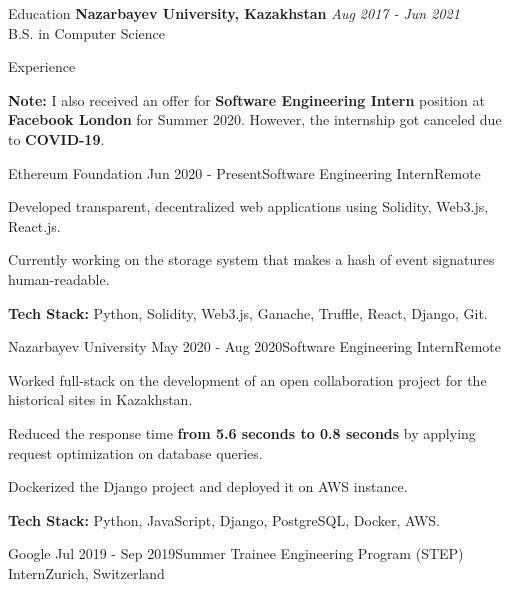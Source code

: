 \documentclass{resume} %
\begin{document}

\begin{rSection}{Education}
{\bf Nazarbayev University, Kazakhstan} \hfill {\em Aug 2017 - Jun 2021} \\ 
B.S. in Computer Science 
\end{rSection}


\begin{rSection}{Experience}

\textbf{Note:} I also received an offer for \textbf{Software Engineering Intern} position at \textbf{Facebook London} for Summer 2020. However, the internship got canceled due to \textbf{COVID-19}.
\smallskip

\begin{rSubsection}{Ethereum Foundation}{ Jun 2020 - Present}{Software Engineering Intern}{Remote}
\item Developed transparent, decentralized web applications using Solidity, Web3.js, React.js.
\item Currently working on the storage system that makes a hash of event signatures human-readable.
\item \textbf{Tech Stack:} Python, Solidity, Web3.js, Ganache, Truffle, React, Django, Git.
\end{rSubsection}

\begin{rSubsection}{Nazarbayev University}{ May 2020 - Aug 2020}{Software Engineering Intern}{Remote}
\item Worked full-stack on the development of an open collaboration project for the historical sites in Kazakhstan.
\item Reduced the response time \textbf{from 5.6 seconds to 0.8 seconds} by applying request optimization on database queries.
\item Dockerized the Django project and deployed it on AWS instance.
\item \textbf{Tech Stack:} Python, JavaScript, Django, PostgreSQL, Docker, AWS.
\end{rSubsection}

\begin{rSubsection}{Google}{ Jul 2019 - Sep 2019}{Summer Trainee Engineering Program (STEP) Intern}{Zurich, Switzerland}


\end{rSubsection}
\end{rSection}
\end{document}
